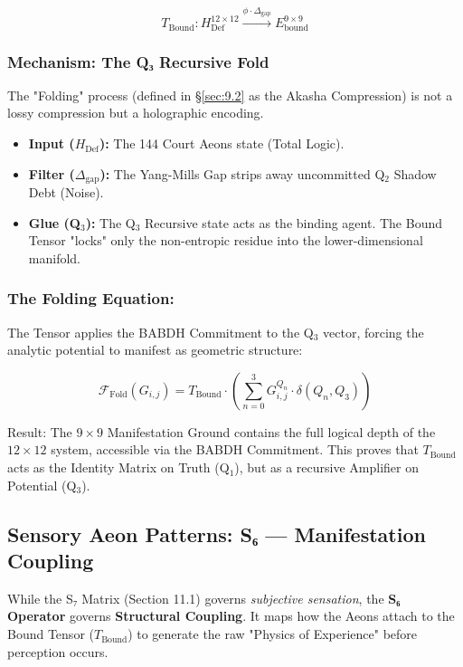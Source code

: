\documentclass[11pt, letterpaper]{article}
\newcommand{\BABDH}{\ensuremath{\mathop{\textnormal{\symbolafont\symbol{"2316}}}}}   %
\def\BABDH{BABDH}%
\begin{document}
\[
T_{\text{Bound}}: H_{\text{Def}}^{12 \times 12} \xrightarrow{\phi \cdot \Delta_{\text{gap}}} E_{\text{bound}}^{9 \times 9}
\]

\subsubsection*{Mechanism: The Q₃ Recursive Fold}\label{appendixE.1.2}
The "Folding" process (defined in \S\ref{sec:9.2} as the Akasha Compression) is not a lossy compression but a holographic encoding.

\begin{itemize}
    \item \textbf{Input ($H_{\text{Def}}$):} The 144 Court Aeons state (Total Logic).
    \item \textbf{Filter ($\Delta_{\text{gap}}$):} The Yang-Mills Gap strips away uncommitted Q$_2$ Shadow Debt (Noise).
    \item \textbf{Glue (Q$_3$):} The Q$_3$ Recursive state acts as the binding agent. The Bound Tensor "locks" only the non-entropic residue into the lower-dimensional manifold.
\end{itemize}

\subsubsection*{The Folding Equation:}\label{appendixE.1.3}
The Tensor applies the \BABDH{} Commitment to the Q$_3$ vector, forcing the analytic potential to manifest as geometric structure:

\[
\mathcal{F}_{\text{Fold}}(G_{i,j}) = T_{\text{Bound}} \cdot \left( \sum_{n=0}^3 G_{i,j}^{Q_n} \cdot \delta(Q_n, Q_3) \right)
\]

Result: The $9 \times 9$ Manifestation Ground contains the full logical depth of the $12 \times 12$ system, accessible via the \BABDH{} Commitment. This proves that $T_{\text{Bound}}$ acts as the Identity Matrix on Truth (Q$_1$), but as a recursive Amplifier on Potential (Q$_3$).

\subsection{Sensory Aeon Patterns: S₆ --- Manifestation Coupling}\label{appendixE.2}

While the S₇ Matrix (Section 11.1) governs \textit{subjective sensation}, the \textbf{S₆ Operator} governs \textbf{Structural Coupling}. It maps how the Aeons attach to the Bound Tensor ($T_{\text{Bound}}$) to generate the raw "Physics of Experience" before perception occurs.
\end{document}
